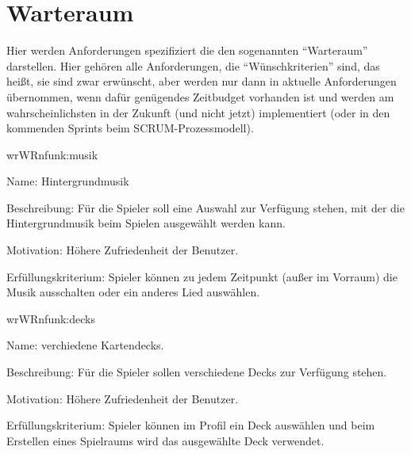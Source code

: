 \chapter{Warteraum}

Hier werden Anforderungen spezifiziert die den sogenannten ``Warteraum'' darstellen. Hier gehören alle Anforderungen, die ``Wünschkriterien'' sind, das heißt, sie sind zwar erwünscht, aber werden nur dann in aktuelle Anforderungen übernommen, wenn dafür genügendes Zeitbudget vorhanden ist und werden am wahrscheinlichsten in der Zukunft (und nicht jetzt) implementiert (oder in den kommenden Sprints beim SCRUM-Prozessmodell).

\setcounter{wr}{10}

\begin{description}[leftmargin=5em, style=sameline]	
	\begin{lhp}{wr}{WR}{nfunk:musik}
		\item [Name:] Hintergrundmusik
		\item [Beschreibung:] Für die Spieler soll eine Auswahl zur Verfügung stehen, mit der die Hintergrundmusik beim Spielen ausgewählt werden kann.
		\item [Motivation:] Höhere Zufriedenheit der Benutzer.
		\item [Erfüllungskriterium:] Spieler können zu jedem Zeitpunkt (außer im Vorraum) die Musik ausschalten oder ein anderes Lied auswählen.
	\end{lhp}

	\begin{lhp}{wr}{WR}{nfunk:decks}
		\item [Name:] verchiedene Kartendecks.
		\item [Beschreibung:] Für die Spieler sollen verschiedene Decks zur Verfügung stehen.
		\item [Motivation:] Höhere Zufriedenheit der Benutzer.
		\item [Erfüllungskriterium:] Spieler können im Profil ein Deck auswählen und beim Erstellen eines Spielraums wird das ausgewählte Deck verwendet.
	\end{lhp}
\end{description}